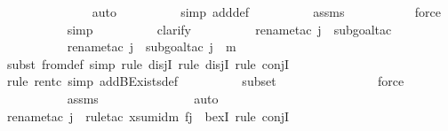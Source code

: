 \begin{isabellebody}
\ \ \ \ \ \ \ \ \ \ \ \ \isamarkupfalse%
\ auto{\isacharbrackleft}{\kern0pt}{}{\isacharbrackright}{\kern0pt}\isanewline
\ \ \ \ \ \ \ \ \ \isamarkupfalse%
{\isacharparenleft}{\kern0pt}simp\ add{\isacharcolon}{\kern0pt}{\isasymDelta}{}{\isacharunderscore}{\kern0pt}def{\isacharparenright}{\kern0pt}\isanewline
\ \ \ \ \ \ \ \ \isamarkupfalse%
\ assms{}\isanewline
\ \ \ \ \ \ \ \ \ \isamarkupfalse%
\ force\isanewline
\ \ \ \ \ \ \ \ \isamarkupfalse%
\ simp\isanewline
\ \ \ \ \ \ \ \ \isamarkupfalse%
\ clarify\ \isanewline
\ \ \ \ \ \ \ \ \isamarkupfalse%
{\isacharparenleft}{\kern0pt}rename{\isacharunderscore}{\kern0pt}tac\ j\ {\isasympsi}{\isacharcomma}{\kern0pt}\ subgoal{\isacharunderscore}{\kern0pt}tac\ {\isachardoublequoteopen}{\isasympsi}\ {\isasymin}\ {\isasymDelta}{}{\isachardoublequoteclose}{\isacharparenright}{\kern0pt}\isanewline
\ \ \ \ \ \ \ \ \ \isamarkupfalse%
{\isacharparenleft}{\kern0pt}rename{\isacharunderscore}{\kern0pt}tac\ j\ {\isasympsi}{\isacharcomma}{\kern0pt}\ subgoal{\isacharunderscore}{\kern0pt}tac\ {\isachardoublequoteopen}j\ {\isasymle}\ m{\isachardoublequoteclose}{\isacharparenright}{\kern0pt}\isanewline
\ \ \ \ \ \ \ \ \ \ \isamarkupfalse%
{\isacharparenleft}{\kern0pt}subst\ {\isasymDelta}{}{\isacharunderscore}{\kern0pt}from{\isacharunderscore}{\kern0pt}def{\isacharcomma}{\kern0pt}\ simp{\isacharcomma}{\kern0pt}\ rule\ disjI{}{\isacharcomma}{\kern0pt}\ rule\ disjI{}{\isacharcomma}{\kern0pt}\ rule\ conjI{\isacharparenright}{\kern0pt}\isanewline
\ \ \ \ \ \ \ \ \ \ \ \isamarkupfalse%
{\isacharparenleft}{\kern0pt}rule\ ren{\isacharunderscore}{\kern0pt}tc{\isacharcomma}{\kern0pt}\ simp\ add{\isacharcolon}{\kern0pt}BExists{\isacharprime}{\kern0pt}{\isacharunderscore}{\kern0pt}def{\isacharparenright}{\kern0pt}\isanewline
\ \ \ \ \ \ \ \ \isamarkupfalse%
\ {\isasymDelta}{}{\isacharunderscore}{\kern0pt}subset\isanewline
\ \ \ \ \ \ \ \ \ \ \ \ \ \ \isamarkupfalse%
\ force\isanewline
\ \ \ \ \ \ \ \ \isamarkupfalse%
\ assms{}\isanewline
\ \ \ \ \ \ \ \ \ \ \ \ \ \isamarkupfalse%
\ auto{\isacharbrackleft}{\kern0pt}{}{\isacharbrackright}{\kern0pt}\isanewline
\ \ \ \ \ \ \ \ \ \ \isamarkupfalse%
{\isacharparenleft}{\kern0pt}rename{\isacharunderscore}{\kern0pt}tac\ j\ {\isasympsi}{\isacharcomma}{\kern0pt}\ rule{\isacharunderscore}{\kern0pt}tac\ x{\isacharequal}{\kern0pt}{\isachardoublequoteopen}sum{\isacharunderscore}{\kern0pt}id{\isacharparenleft}{\kern0pt}m{\isacharcomma}{\kern0pt}\ f{\isacharparenright}{\kern0pt}{\isacharbackquote}{\kern0pt}j{\isachardoublequoteclose}\ \ bexI{\isacharcomma}{\kern0pt}\ rule\ conjI{\isacharparenright}{\kern0pt}\isanewline

\end{isabellebody}
